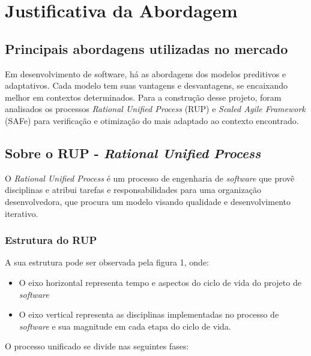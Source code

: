 \chapter{Justificativa da Abordagem}
\label{justify}

\section{Principais abordagens utilizadas no mercado}

Em desenvolvimento de software, há as abordagens dos modelos preditivos e adaptativos. Cada modelo tem suas vantagens e desvantagens, se encaixando melhor em contextos determinados. Para a construção desse projeto, foram analisados os processos \textit{Rational Unified Process} (RUP) e \textit{Scaled Agile Framework} (SAFe) para verificação e otimização do mais adaptado ao contexto encontrado.

\section{Sobre o RUP - \textit{Rational Unified Process}}

O \textit{Rational Unified Process} é um processo de engenharia de \textit{software} que provê disciplinas e atribui tarefas e responsabilidades para uma organização desenvolvedora, que procura um modelo visando qualidade e desenvolvimento iterativo.

\subsection{Estrutura do RUP}

A sua estrutura pode ser observada pela figura 1, onde:

\begin{itemize}
\item O eixo horizontal representa tempo e aspectos do ciclo de vida do projeto de \textit{software}
\item O eixo vertical representa as disciplinas implementadas no processo de \textit{software} e sua magnitude em cada etapa do ciclo de vida.
\end{itemize}

O processo unificado se divide nas seguintes fases:

